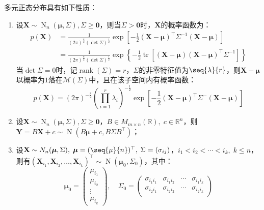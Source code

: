 \begin{property}\label{prop:MultiNormal}
	多元正态分布具有如下性质：
	\begin{enumerate}
		\item 设$\mathbf{X}\sim\operatorname{N}_n(\boldsymbol{\mu},\Sigma),\Sigma\geqslant\mathbf{0}$，则当$\Sigma>\mathbf{0}$时，$\mathbf{X}$的概率函数为：
		\begin{align*}
			p(\mathbf{X})&=\frac{1}{(2\pi)^{\frac{n}{2}}(\det\Sigma)^{\frac{1}{2}}}\exp\left[-\frac{1}{2}(\mathbf{X}-\boldsymbol{\mu})^{\top}\Sigma^{-1}(\mathbf{X}-\boldsymbol{\mu})\right] \\
			&=\frac{1}{(2\pi)^{\frac{n}{2}}(\det\Sigma)^{\frac{1}{2}}}\exp\left\{-\frac{1}{2}\operatorname{tr}[(\mathbf{X}-\boldsymbol{\mu})(\mathbf{X}-\boldsymbol{\mu})^{\top}\Sigma^{-1}]\right\}
		\end{align*}
		当$\det\Sigma=0$时，记$\operatorname{rank}(\Sigma)=r$，$\Sigma$的非零特征值为$\seq{\lambda}{r}$，则$\mathbf{X}-\boldsymbol{\mu}$以概率为$1$落在$\mathcal{M}(\Sigma)$中，且在该子空间内有概率函数：
		\begin{equation*}
			p(\mathbf{X})=(2\pi)^{-\frac{r}{2}}\left(\prod\limits_{i=1}^r\lambda_i\right)^{-\frac{1}{2}}\exp\left[-\frac{1}{2}(\mathbf{X}-\boldsymbol{\mu})^{\top}\Sigma^-(\mathbf{X}-\boldsymbol{\mu})\right]
		\end{equation*}
		\item 设$\mathbf{X}\sim\operatorname{N}_n(\boldsymbol{\mu},\Sigma),\Sigma\geqslant\mathbf{0}$，$B\in M_{m\times n}(\mathbb{R}),\;c\in\mathbb{R}^{n}$，则$\mathbf{Y}=B\mathbf{X}+c\sim \operatorname{N}(B\boldsymbol{\mu}+c,B\Sigma B^{\top})$；
		\item 设$\mathbf{X}\sim N_n(\boldsymbol{\mu},\Sigma),\;\boldsymbol{\mu}=(\seq{\mu}{n})^{\top},\;\Sigma=(\sigma_{ij})$，$i_1<i_2<\cdots<i_k,\;k\leqslant n$，则有$(\mathbf{X}_{i_1},\mathbf{X}_{i_2},\dots,\mathbf{X}_{i_k})^{\top}\sim \operatorname{N}(\boldsymbol{\mu}_0,\Sigma_0)$，其中：
		\begin{equation*}
			\boldsymbol{\mu}_0=
			\begin{pmatrix}
				\mu_{i_1} \\
				\mu_{i_2} \\
				\vdots \\
				\mu_{i_k}
			\end{pmatrix}
			,\quad
			\Sigma_0=
			\begin{pmatrix}
				\sigma_{i_1i_1} & \sigma_{i_1i_2} & \cdots & \sigma_{i_1i_k} \\
				\sigma_{i_2i_1} & \sigma_{i_2i_2} & \cdots & \sigma_{i_2i_k} \\

\end{pmatrix}
\end{equation*}
\end{enumerate}
\end{property}
